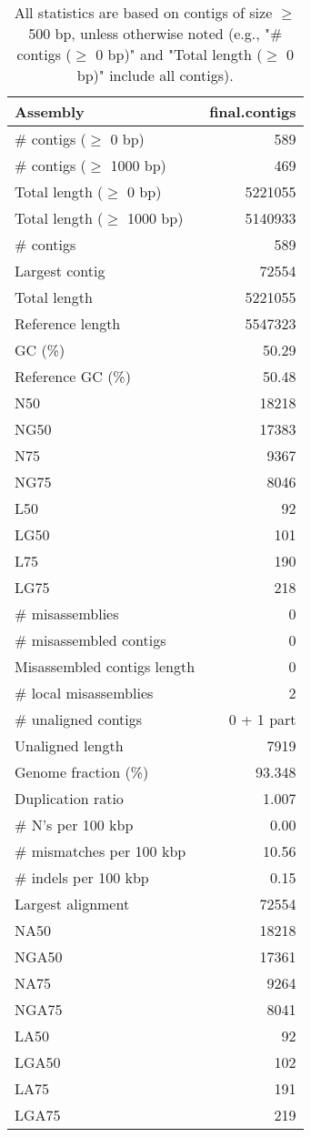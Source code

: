\documentclass[12pt,a4paper]{article}
\begin{document}
\begin{table}[ht]
\begin{center}
\caption{All statistics are based on contigs of size $\geq$ 500 bp, unless otherwise noted (e.g., "\# contigs ($\geq$ 0 bp)" and "Total length ($\geq$ 0 bp)" include all contigs).}
\begin{tabular}{|l*{1}{|r}|}
\hline
Assembly & final.contigs \\ \hline
\# contigs ($\geq$ 0 bp) & 589 \\ \hline
\# contigs ($\geq$ 1000 bp) & 469 \\ \hline
Total length ($\geq$ 0 bp) & 5221055 \\ \hline
Total length ($\geq$ 1000 bp) & 5140933 \\ \hline
\# contigs & 589 \\ \hline
Largest contig & 72554 \\ \hline
Total length & 5221055 \\ \hline
Reference length & 5547323 \\ \hline
GC (\%) & 50.29 \\ \hline
Reference GC (\%) & 50.48 \\ \hline
N50 & 18218 \\ \hline
NG50 & 17383 \\ \hline
N75 & 9367 \\ \hline
NG75 & 8046 \\ \hline
L50 & 92 \\ \hline
LG50 & 101 \\ \hline
L75 & 190 \\ \hline
LG75 & 218 \\ \hline
\# misassemblies & 0 \\ \hline
\# misassembled contigs & 0 \\ \hline
Misassembled contigs length & 0 \\ \hline
\# local misassemblies & 2 \\ \hline
\# unaligned contigs & 0 + 1 part \\ \hline
Unaligned length & 7919 \\ \hline
Genome fraction (\%) & 93.348 \\ \hline
Duplication ratio & 1.007 \\ \hline
\# N's per 100 kbp & 0.00 \\ \hline
\# mismatches per 100 kbp & 10.56 \\ \hline
\# indels per 100 kbp & 0.15 \\ \hline
Largest alignment & 72554 \\ \hline
NA50 & 18218 \\ \hline
NGA50 & 17361 \\ \hline
NA75 & 9264 \\ \hline
NGA75 & 8041 \\ \hline
LA50 & 92 \\ \hline
LGA50 & 102 \\ \hline
LA75 & 191 \\ \hline
LGA75 & 219 \\ \hline
\end{tabular}
\end{center}
\end{table}
\end{document}
